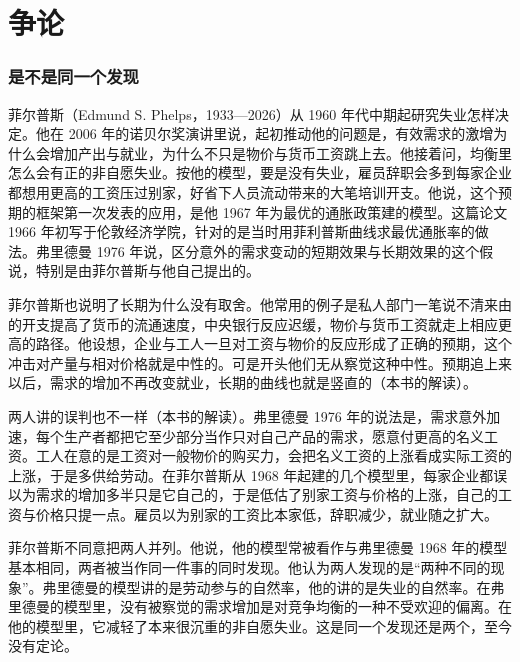 \section{争论}\label{sec:naturalrate-debate}

\subsubsection{是不是同一个发现}

菲尔普斯（Edmund S. Phelps，1933—2026）从 1960 年代中期起研究失业怎样决定\cite{phelps2006,loc44,gnd44}。他在 2006 年的诺贝尔奖演讲里说，起初推动他的问题是，有效需求的激增为什么会增加产出与就业，为什么不只是物价与货币工资跳上去\cite{phelps2006}。他接着问，均衡里怎么会有正的非自愿失业\cite{phelps2006}。按他的模型，要是没有失业，雇员辞职会多到每家企业都想用更高的工资压过别家，好省下人员流动带来的大笔培训开支\cite{phelps2006}。他说，这个预期的框架第一次发表的应用，是他 1967 年为最优的通胀政策建的模型\cite{phelps2006}。这篇论文 1966 年初写于伦敦经济学院，针对的是当时用菲利普斯曲线求最优通胀率的做法\cite{phelps2006}。弗里德曼 1976 年说，区分意外的需求变动的短期效果与长期效果的这个假说，特别是由菲尔普斯与他自己提出的\cite{friedman1976}。

菲尔普斯也说明了长期为什么没有取舍。他常用的例子是私人部门一笔说不清来由的开支提高了货币的流通速度，中央银行反应迟缓，物价与货币工资就走上相应更高的路径\cite{phelps2006}。他设想，企业与工人一旦对工资与物价的反应形成了正确的预期，这个冲击对产量与相对价格就是中性的\cite{phelps2006}。可是开头他们无从察觉这种中性\cite{phelps2006}。预期追上来以后，需求的增加不再改变就业，长期的曲线也就是竖直的（本书的解读）。

两人讲的误判也不一样（本书的解读）。弗里德曼 1976 年的说法是，需求意外加速，每个生产者都把它至少部分当作只对自己产品的需求，愿意付更高的名义工资\cite{friedman1976}。工人在意的是工资对一般物价的购买力，会把名义工资的上涨看成实际工资的上涨，于是多供给劳动\cite{friedman1976}。在菲尔普斯从 1968 年起建的几个模型里，每家企业都误以为需求的增加多半只是它自己的，于是低估了别家工资与价格的上涨，自己的工资与价格只提一点\cite{phelps2006}。雇员以为别家的工资比本家低，辞职减少，就业随之扩大\cite{phelps2006}。

菲尔普斯不同意把两人并列。他说，他的模型常被看作与弗里德曼 1968 年的模型基本相同，两者被当作同一件事的同时发现\cite{phelps2006}。他认为两人发现的是“两种不同的现象”。弗里德曼的模型讲的是劳动参与的自然率，他的讲的是失业的自然率\cite{phelps2006}。在弗里德曼的模型里，没有被察觉的需求增加是对竞争均衡的一种不受欢迎的偏离。在他的模型里，它减轻了本来很沉重的非自愿失业\cite{phelps2006}。这是同一个发现还是两个，至今没有定论。

